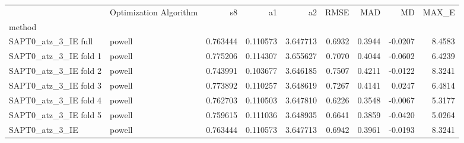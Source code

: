 \begin{tabular}{llrrrrrrr}
 & Optimization Algorithm & s8 & a1 & a2 & RMSE & MAD & MD & MAX_E \\
method &  &  &  &  &  &  &  &  \\
SAPT0_atz_3_IE full & powell & 0.763444 & 0.110573 & 3.647713 & 0.6932 & 0.3944 & -0.0207 & 8.4583 \\
SAPT0_atz_3_IE fold 1 & powell & 0.775206 & 0.114307 & 3.655627 & 0.7070 & 0.4044 & -0.0602 & 6.4239 \\
SAPT0_atz_3_IE fold 2 & powell & 0.743991 & 0.103677 & 3.646185 & 0.7507 & 0.4211 & -0.0122 & 8.3241 \\
SAPT0_atz_3_IE fold 3 & powell & 0.773892 & 0.110257 & 3.648619 & 0.7267 & 0.4141 & 0.0247 & 6.4814 \\
SAPT0_atz_3_IE fold 4 & powell & 0.762703 & 0.110503 & 3.647810 & 0.6226 & 0.3548 & -0.0067 & 5.3177 \\
SAPT0_atz_3_IE fold 5 & powell & 0.759615 & 0.111036 & 3.648935 & 0.6641 & 0.3859 & -0.0420 & 5.0264 \\
SAPT0_atz_3_IE & powell & 0.763444 & 0.110573 & 3.647713 & 0.6942 & 0.3961 & -0.0193 & 8.3241 \\
\end{tabular}
